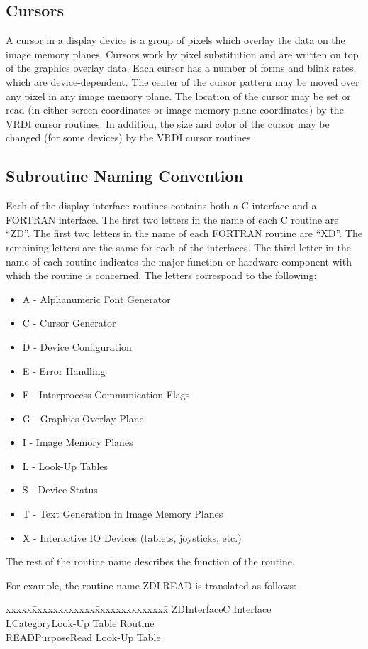 \subsection{Cursors}
A cursor in a display device is a group of pixels which overlay
the data on the image memory planes.  Cursors work by pixel
substitution and are written on top of the graphics overlay
data.  Each cursor has a number of forms and blink rates, which
are device-dependent.  The center of the cursor pattern may be
moved over any pixel in any image memory plane.  The location
of the cursor may be set or read (in either screen coordinates
or image memory plane coordinates) by the VRDI cursor routines.
In addition, the size and color of the cursor may be
changed (for some devices) by the VRDI cursor routines.
\subsection{Subroutine Naming Convention}
Each of the display interface routines contains both a C interface
and a FORTRAN interface.  The first two letters in the name of each
C routine are ``ZD''.  The first two letters in the name of each
FORTRAN routine are ``XD''.  The remaining letters are the same for
each of the interfaces.  The third letter in the name of each routine
indicates the major function or hardware component with which the
routine is  concerned.  The letters correspond to the following:
\begin{itemize}
\item A  -  Alphanumeric Font Generator
\item C  -  Cursor Generator
\item D  -  Device Configuration
\item E  -  Error Handling
\item F  -  Interprocess Communication Flags
\item G  -  Graphics Overlay Plane
\item I  -  Image Memory Planes
\item L  -  Look-Up Tables
\item S  -  Device Status
\item T  -  Text Generation in Image Memory Planes
\item X  -  Interactive IO Devices (tablets, joysticks, etc.)
\end{itemize}
The rest of the routine name describes the function of the routine.

For example, the routine name ZDLREAD is translated as follows:
\begin{tabbing}
xxxxx\=xxxxxxxxxxxx\=xxxxxxxxxxxxxx\=\kill
\>ZD\>Interface\>C Interface\\
\>L\>Category\>Look-Up Table Routine\\
\>READ\>Purpose\>Read Look-Up Table\\
\end{tabbing}
